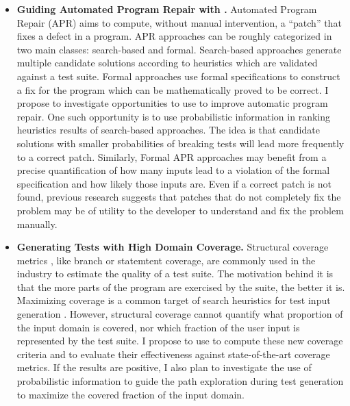 \documentclass[10pt]{article}
\newcounter{list}
\begin{document}
\begin{itemize}
\item \textbf{Guiding Automated Program Repair with \PSE{}.}
Automated Program Repair \cite{le2015manybugs} (APR) aims to compute,
without manual intervention, a ``patch'' that fixes a defect in a
program. APR approaches can be roughly categorized in two main classes:
search-based and formal.  Search-based approaches generate multiple
candidate solutions according to heuristics which are validated
against a test suite. Formal approaches use formal specifications to
construct a fix for the program which can be mathematically proved to
be correct. I propose to investigate opportunities to use \PSE{} to
improve automatic program repair. One such opportunity is to use
probabilistic information in ranking heuristics results of search-based
approaches. The idea is that candidate solutions with smaller
probabilities of breaking tests will lead more frequently to a correct
patch. Similarly, Formal APR approaches may benefit from a precise
quantification of how many inputs lead to a violation of the formal
specification and how likely those inputs are. Even if a correct patch
is not found, previous research \cite{le2013current} suggests that
patches that do not completely fix the problem may be of utility to
the developer to understand and fix the problem manually.


\item \textbf{Generating Tests with High Domain Coverage.}  Structural
  coverage metrics \cite{mockus2009test}, like branch or statemtent
  coverage, are commonly used in the industry to estimate the quality
  of a test suite. The motivation behind it is that the more parts of
  the program are exercised by the suite, the better it is. Maximizing
  coverage is a common target of search heuristics for test input
  generation \cite{godefroid2008automated}. However, structural
  coverage cannot quantify what proportion of the input domain is
  covered, nor which fraction of the user input is represented by the
  test suite. I propose to use \PSE{} to compute these new coverage
  criteria and to evaluate their effectiveness against
  state-of-the-art coverage metrics. If the results are positive, I
  also plan to investigate the use of probabilistic information to
  guide the path exploration during test generation to maximize
  the covered fraction of the input domain.
  
\end{itemize}
\end{document}
